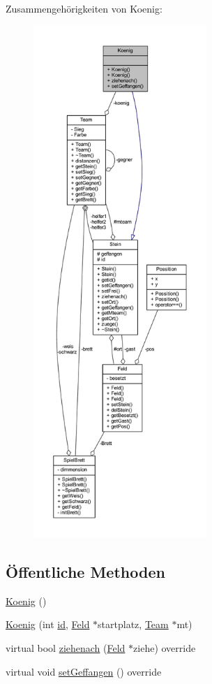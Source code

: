 Zusammengehörigkeiten von Koenig\+:\nopagebreak
\begin{figure}[H]
\begin{center}
\leavevmode
\includegraphics[height=550pt]{class_koenig__coll__graph}
\end{center}
\end{figure}
\subsection*{Öffentliche Methoden}
\begin{DoxyCompactItemize}
\item 
\hyperlink{class_koenig_a213d4b6961d0709bd1b48e469c7e5edf}{Koenig} ()
\item 
\hyperlink{class_koenig_a66858d9341213d157c1e478b74efb974}{Koenig} (int \hyperlink{class_stein_ab8a179db9a227d710ce7d236ecae37ee}{id}, \hyperlink{class_feld}{Feld} $\ast$startplatz, \hyperlink{class_team}{Team} $\ast$mt)
\item 
virtual bool \hyperlink{class_koenig_a6060e36b885b96aad97fa4c66646942f}{ziehenach} (\hyperlink{class_feld}{Feld} $\ast$ziehe) override
\item 
virtual void \hyperlink{class_koenig_a66d3242a51e934cc35bb8adabdba8a4a}{set\+Geffangen} () override
\end{DoxyCompactItemize}
